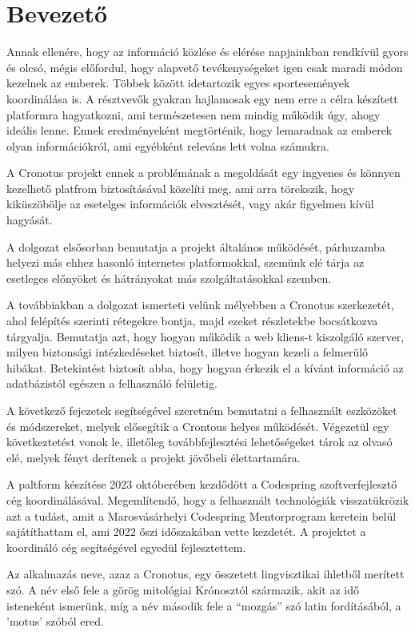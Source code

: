 \chapter{Bevezető}%

Annak ellenére, hogy az információ közlése és elérése napjainkban rendkívül gyors és olcsó, mégis előfordul, hogy alapvető tevékenységeket igen csak maradi módon kezelnek az emberek. Többek között idetartozik egyes sportesemények koordinálása is. A résztvevők gyakran hajlamosak egy nem erre a célra készített platformra hagyatkozni, ami természetesen nem mindig működik úgy, ahogy ideális lenne. Ennek eredményeként megtörténik, hogy lemaradnak az emberek olyan információkról, ami egyébként releváns lett volna számukra.

A Cronotus projekt ennek a problémának a megoldását egy ingyenes és könnyen kezelhető platfrom biztosításával közelíti meg, ami arra törekszik, hogy kiküszöbölje az esetelges információk elvesztését, vagy akár figyelmen kívül hagyását.

A dolgozat elsősorban bemutatja a projekt általános működését, párhuzamba helyezi más ehhez hasonló internetes platformokkal, szemünk elé tárja az esetleges előnyöket és hátrányokat más szolgáltatásokkal szemben.

A továbbiakban a dolgozat ismerteti velünk mélyebben a Cronotus szerkezetét, ahol felépítés szerinti rétegekre bontja, majd ezeket részletekbe bocsátkozva tárgyalja. Bemutatja azt, hogy hogyan működik a web kliens-t kiszolgáló szerver, milyen biztonsági intézkedéseket biztosít, illetve hogyan kezeli a felmerülő hibákat. Betekintést biztosít abba, hogy hogyan érkezik el a kívánt információ az adatbázistól egészen a felhasználó felületig.

A következő fejezetek segítségével szeretném bemutatni a felhasznált eszközöket és módszereket, melyek elősegítik a Crontous helyes működését. Végezetül egy következtetést vonok le, illetőleg továbbfejlesztési lehetőségeket tárok az olvasó elé, melyek fényt derítenek a projekt jövőbeli élettartamára.

A paltform készítése 2023 októberében kezdődött a Codespring szoftverfejlesztő cég koordinálásával. Megemlítendő, hogy a felhasznált technológiák visszatükrözik azt a tudást, amit a Marosvásárhelyi Codespring Mentorprogram keretein belül sajátíthattam el, ami 2022 őszi időszakában vette kezdetét. A projektet a koordináló cég segítségével egyedül fejlesztettem.

Az alkalmazás neve, azaz a Cronotus, egy összetett lingvisztikai ihletből merített szó. A név első fele a görög mitológiai Krónosztól származik, akit az idő isteneként ismerünk, míg a név második fele a ``mozgás'' szó latin fordításából, a 'motus' szóból ered.
